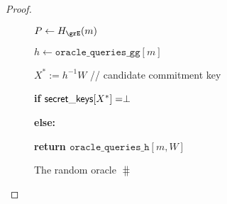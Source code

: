\begin{proof}
\begin{figure}
\begin{minipage}{7cm}
{{					
					
					
					
					{$ P \leftarrow \hashG(m) $}
					
					{$ h \leftarrow \mathtt{oracle\_queries\_gg}[m] $}
					
					{$ X^* := h^{-1}W $ // candidate commitment key} 
					
					{{\textbf{if} ${\mathsf{secret\_keys}}[X^*] = \perp$ }} 
					
					
					\tabdbl{$ \pk^* \leftsample \grE $} %
					
					\tabdbl{$ \pkeys[X^*] \leftarrow \pk^* $}
					
					
					
					
					
					{\textbf{else:} }
					
					
					
					
					\textbf{return $  \mathtt{oracle\_queries\_h}[m,  W] $}
					
			}}	
			\caption{The random oracle $ \hash $}
			\label{oracle:HnoPK}
		\end{minipage}
		\end{figure}
		

\end{proof}
